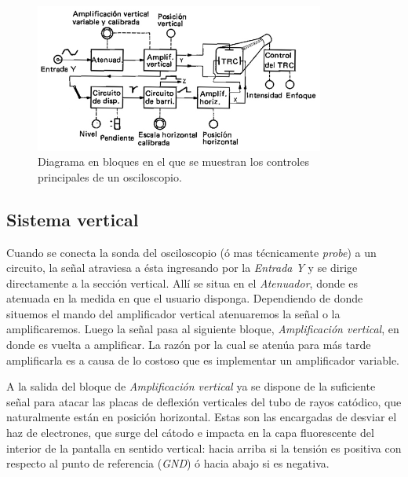 \documentclass{article}
\begin{document}
\begin{figure}[h]
	\centering
	\includegraphics[width=0.85\textwidth]{images/01-diagrama-bloques-osc.jpg}
	\medskip
	\caption{Diagrama en bloques en el que se muestran los controles\\ principales de un osciloscopio.}
\end{figure}
\bigskip



\subsection{Sistema vertical}
	
	Cuando se conecta la sonda del osciloscopio (ó mas técnicamente \textit{probe}) a un circuito, la señal atraviesa a ésta ingresando por la \textit{Entrada Y} y se dirige directamente a la sección vertical. Allí se situa en el \textit{Atenuador}, donde es atenuada en la medida en que el usuario disponga. Dependiendo de donde situemos el mando del amplificador vertical atenuaremos la señal o la amplificaremos. Luego la señal pasa al siguiente bloque, \textit{Amplificación vertical}, en donde es vuelta a amplificar. La razón por la cual se atenúa para más tarde amplificarla es a causa de lo costoso que es implementar un amplificador variable.
	\par
	A la salida del bloque de \textit{Amplificación vertical} ya se dispone de la suficiente señal para atacar las placas de deflexión verticales del tubo de rayos catódico, que naturalmente están en posición horizontal. Estas son las encargadas de desviar el haz de electrones, que surge del cátodo e impacta en la capa fluorescente del interior de la pantalla en sentido vertical: hacia arriba si la tensión es positiva con respecto al punto de referencia (\textit{GND}) ó hacia abajo si es negativa.
	\bigskip
	
\end{document}
